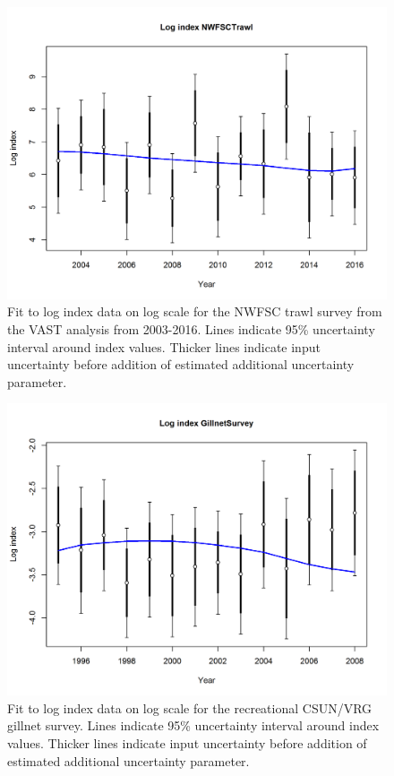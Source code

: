 \documentclass[12pt,]{article}
\begin{document}
\begin{figure}[htbp]
\centering
\includegraphics{r4ss/plots_mod1/index5_logcpuefit_NWFSCtrawl.png}
\caption{Fit to log index data on log scale for the NWFSC trawl survey
from the VAST analysis from 2003-2016. Lines indicate 95\% uncertainty
interval around index values. Thicker lines indicate input uncertainty
before addition of estimated additional uncertainty parameter.
\label{fig:index5_logcpuefit_NWFSCtrawl}}
\end{figure}

\begin{figure}[htbp]
\centering
\includegraphics{r4ss/plots_mod1/index5_logcpuefit_GillnetSurvey.png}
\caption{Fit to log index data on log scale for the recreational
CSUN/VRG gillnet survey. Lines indicate 95\% uncertainty interval around
index values. Thicker lines indicate input uncertainty before addition
of estimated additional uncertainty parameter.
\label{fig:index5_logcpuefit_GillnetSurvey}}
\end{figure}
\end{document}
